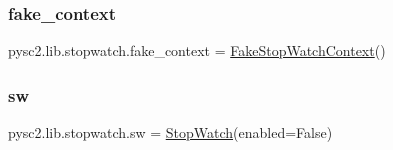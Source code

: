 \subsubsection{\texorpdfstring{fake\+\_\+context}{fake\_context}}
{\footnotesize\ttfamily pysc2.\+lib.\+stopwatch.\+fake\+\_\+context = \mbox{\hyperlink{classpysc2_1_1lib_1_1stopwatch_1_1_fake_stop_watch_context}{Fake\+Stop\+Watch\+Context}}()}

\mbox{\label{namespacepysc2_1_1lib_1_1stopwatch_af902a678c1100412f8e448b4eb06e849}} 
\subsubsection{\texorpdfstring{sw}{sw}}
{\footnotesize\ttfamily pysc2.\+lib.\+stopwatch.\+sw = \mbox{\hyperlink{classpysc2_1_1lib_1_1stopwatch_1_1_stop_watch}{Stop\+Watch}}(enabled=False)}

